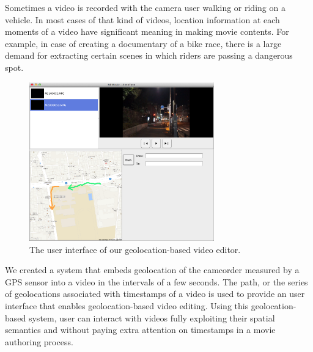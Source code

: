 
Sometimes a video is recorded with the camera user walking or riding on a vehicle.
In most cases of that kind of videos, location information at each moments of a video have significant meaning in making movie contents.
For example, in case of creating a documentary of a bike race, there is a large demand for extracting certain scenes in which riders are passing a dangerous spot.

\begin{figure}[htbp]
 \begin{center}
  \includegraphics[width=80mm]{application_map.png}
 \end{center}
 \caption{The user interface of our geolocation-based video editor.}
 \label{fig:appl_map}
\end{figure}

We created a system that embeds geolocation of the camcorder measured by a GPS sensor into a video in the intervals of a few seconds.
The path, or the series of geolocations associated with timestamps of a video is used to provide an user interface that enables geolocation-based video editing.
Using this geolocation-based system, user can interact with videos fully exploiting their spatial semantics and without paying extra attention on timestamps in a movie authoring process.

